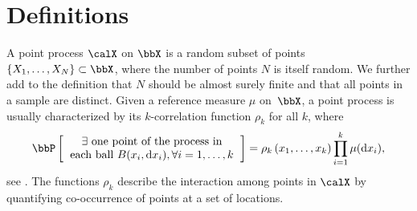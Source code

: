 \documentclass[twoside,11pt]{article}
\begin{document}



    \section{Definitions} %
    \label{sec:definitions}

        A point process $\calX$ on $\bbX$ is a random subset of points $\lrcb{X_1, \dots, X_N} \subset \bbX$, where the number of points $N$ is itself random.
        We further add to the definition that $N$ should be almost surely finite and that all points in a sample are distinct.
        Given a reference measure $\mu$ on~$\bbX$, a point process is usually characterized by its $k$-correlation function $\rho_k$ for all $k$, where
        \begin{equation*}
        \label{eq:correlation_function_intuition}
            \Proba{
                \begin{tabular}{c}
                    $\exists$ one point of the process in\\
                    each ball $B(x_i, \diff x_i), \forall i=1,\dots, k $
                \end{tabular}
            }
            = \rho_k\lrp{x_1,\dots,x_k}
                \prod_{i=1}^k \mu(\diff x_i),
        \end{equation*}
        see \citet[Section 4]{MoWa04}.
        The functions $\rho_k$ describe the interaction among points in $\calX$ by quantifying co-occurrence of points at a set of locations.
\end{document}
